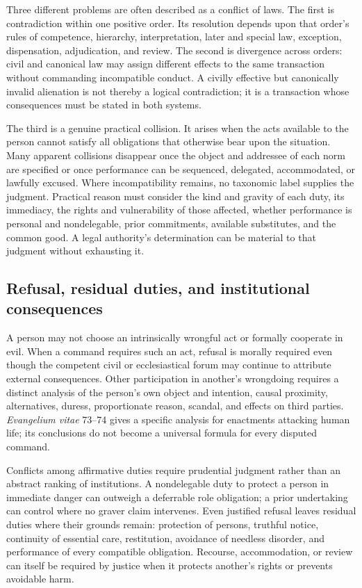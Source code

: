 Three different problems are often described as a conflict of laws. The first is contradiction within one positive order. Its resolution depends upon that order's rules of competence, hierarchy, interpretation, later and special law, exception, dispensation, adjudication, and review. The second is divergence across orders: civil and canonical law may assign different effects to the same transaction without commanding incompatible conduct. A civilly effective but canonically invalid alienation is not thereby a logical contradiction; it is a transaction whose consequences must be stated in both systems.

The third is a genuine practical collision. It arises when the acts available to the person cannot satisfy all obligations that otherwise bear upon the situation. Many apparent collisions disappear once the object and addressee of each norm are specified or once performance can be sequenced, delegated, accommodated, or lawfully excused. Where incompatibility remains, no taxonomic label supplies the judgment. Practical reason must consider the kind and gravity of each duty, its immediacy, the rights and vulnerability of those affected, whether performance is personal and nondelegable, prior commitments, available substitutes, and the common good. A legal authority's determination can be material to that judgment without exhausting it.

\subsection{Refusal, residual duties, and institutional consequences}

A person may not choose an intrinsically wrongful act or formally cooperate in evil. When a command requires such an act, refusal is morally required even though the competent civil or ecclesiastical forum may continue to attribute external consequences. Other participation in another's wrongdoing requires a distinct analysis of the person's own object and intention, causal proximity, alternatives, duress, proportionate reason, scandal, and effects on third parties. \emph{Evangelium vitae} 73--74 gives a specific analysis for enactments attacking human life; its conclusions do not become a universal formula for every disputed command.

Conflicts among affirmative duties require prudential judgment rather than an abstract ranking of institutions. A nondelegable duty to protect a person in immediate danger can outweigh a deferrable role obligation; a prior undertaking can control where no graver claim intervenes. Even justified refusal leaves residual duties where their grounds remain: protection of persons, truthful notice, continuity of essential care, restitution, avoidance of needless disorder, and performance of every compatible obligation. Recourse, accommodation, or review can itself be required by justice when it protects another's rights or prevents avoidable harm.
